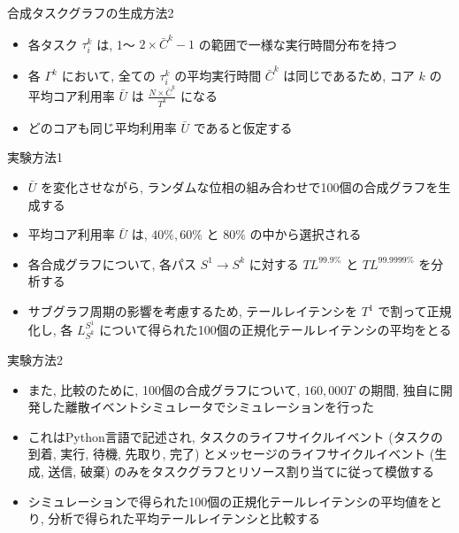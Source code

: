 \begin{frame}{合成タスクグラフの生成方法2}
    \begin{itemize}
        \item 各タスク $\tau_{i}^{k}$ は, 1～ $2 \times \bar{C}^{k}-1$ の範囲で一様な実行時間分布を持つ
        \item 各 $\Gamma^{k}$ において, 全ての $\tau_{i}^{k}$ の平均実行時間 $\bar{C}^{k}$ は同じであるため, コア $k$ の平均コア利用率 $\bar{U}$ は $\frac{N \times \bar{C}^{k}}{T^{k}}$ になる
        \item どのコアも同じ平均利用率 $\bar{U}$ であると仮定する
    \end{itemize}
\end{frame}

\begin{frame}{実験方法1}
    \begin{itemize}
        \item $\bar{U}$ を変化させながら, ランダムな位相の組み合わせで100個の合成グラフを生成する
        \item 平均コア利用率 $\bar{U}$ は, $40 \%, 60 \%$ と $80 \%$ の中から選択される
        \item 各合成グラフについて, 各パス $S^{1} \rightarrow S^{k}$ に対する $T L^{99.9 \%}$ と $T L^{99.9999 \%}$ を分析する
        \item サブグラフ周期の影響を考慮するため, テールレイテンシを $T^{1}$ で割って正規化し, 各 $L_{S^{k}}^{S^{1}}$ について得られた100個の正規化テールレイテンシの平均をとる
    \end{itemize}
\end{frame}

\begin{frame}{実験方法2}
    \begin{itemize}
        \item また, 比較のために, 100個の合成グラフについて, $160,000 T$ の期間, 独自に開発した離散イベントシミュレータでシミュレーションを行った
        \item これはPython言語で記述され, タスクのライフサイクルイベント (タスクの到着, 実行, 待機, 先取り, 完了) とメッセージのライフサイクルイベント (生成, 送信, 破棄) のみをタスクグラフとリソース割り当てに従って模倣する
        \item シミュレーションで得られた100個の正規化テールレイテンシの平均値をとり, 分析で得られた平均テールレイテンシと比較する
    \end{itemize}
\end{frame}


